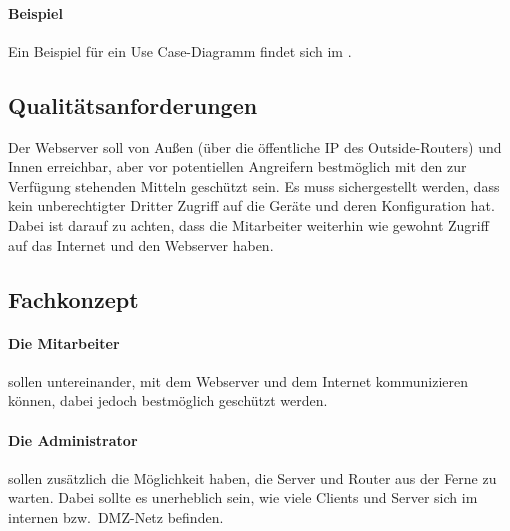 \paragraph{Beispiel}
Ein Beispiel für ein Use Case-Diagramm findet sich im .


\subsection{Qualitätsanforderungen}
\label{sec:Qualitaetsanforderungen}
Der Webserver soll von Außen (über die öffentliche IP des Outside-Routers) und Innen erreichbar, aber vor potentiellen Angreifern bestmöglich mit den zur Verfügung stehenden Mitteln geschützt sein. Es muss sichergestellt werden, dass kein unberechtigter Dritter Zugriff auf die Geräte und deren Konfiguration hat. Dabei ist darauf zu achten, dass die Mitarbeiter weiterhin wie gewohnt Zugriff auf das Internet und den Webserver haben.

\subsection{Fachkonzept}
\label{sec:Lastenheft}

\paragraph*{Die Mitarbeiter } sollen untereinander, mit dem Webserver und dem Internet kommunizieren können, dabei jedoch bestmöglich geschützt werden.
\paragraph*{Die Administrator } sollen zusätzlich die Möglichkeit haben, die Server und Router aus der Ferne zu warten. Dabei sollte es unerheblich sein, wie viele Clients und Server sich im internen bzw.\ DMZ-Netz befinden.


